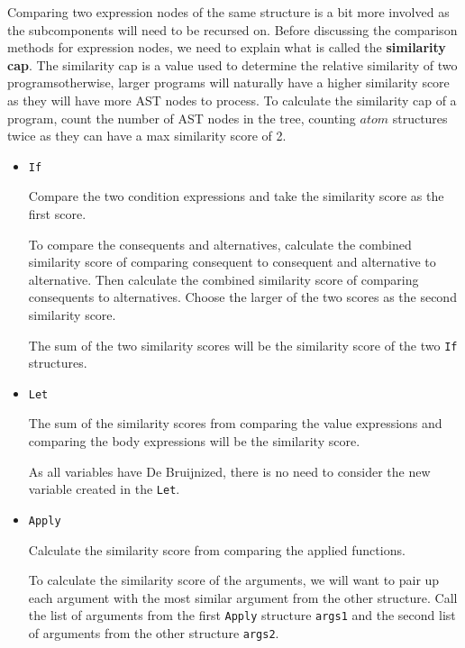 \documentclass[12pt]{article}
\newcommand{\itm}[1]{\ensuremath{\mathit{#1}}}
\newcommand{\key}[1]{\texttt{#1}}
\newcommand{\Atm}[0]{\itm{atom}}
\begin{document}
\hfill

Comparing two expression nodes of the same structure is a bit more involved as the subcomponents will need to be recursed on. Before discussing the comparison methods for expression nodes, we need to explain what is called the \textbf{similarity cap}. The similarity cap is a value used to determine the relative similarity of two programs\textemdash otherwise, larger programs will naturally have a higher similarity score as they will have more AST nodes to process. To calculate the similarity cap of a program, count the number of AST nodes in the tree, counting \Atm{} structures twice as they can have a max similarity score of 2.

\hfill

\begin{itemize}
  \item\key{If}
    \begin{adjustwidth}{5mm}{}
      Compare the two condition expressions and take the similarity score as the first score.

      To compare the consequents and alternatives, calculate the combined similarity score of comparing consequent to consequent and alternative to alternative. Then calculate the combined similarity score of comparing consequents to alternatives. Choose the larger of the two scores as the second similarity score.

      The sum of the two similarity scores will be the similarity score of the two \key{If} structures.
    \end{adjustwidth}

  \item\key{Let}
    \begin{adjustwidth}{5mm}{}
      The sum of the similarity scores from comparing the value expressions and comparing the body expressions will be the similarity score.

      As all variables have De Bruijnized, there is no need to consider the new variable created in the \key{Let}.
    \end{adjustwidth}

  \item\key{Apply}
    \begin{adjustwidth}{5mm}{}
      Calculate the similarity score from comparing the applied functions.

      To calculate the similarity score of the arguments, we will want to pair up each argument with the most similar argument from the other structure. Call the list of arguments from the first \key{Apply} structure \key{args1} and the second list of arguments from the other structure \key{args2}.


\end{adjustwidth}
\end{itemize}
\end{document}
